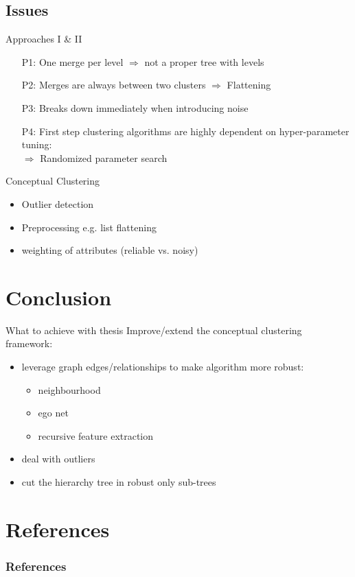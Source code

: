 \documentclass[rgb]{beamer}
\begin{document}
    \subsection{Issues}
        \begin{frame}{Approaches I \& II}
            \begin{itemize}
                \item[P1:] One merge per level $\Rightarrow$ not a proper tree with levels
                \item[P2:] Merges are always between two clusters
                $\Rightarrow$ Flattening
                \item[P3:] Breaks down immediately when introducing noise
                \item[P4:] First step clustering algorithms are highly dependent on hyper-parameter tuning: \\
                $\Rightarrow$ Randomized parameter search
            \end{itemize}
        \end{frame}

    \begin{frame}{Conceptual Clustering}
        \begin{itemize}
            \item Outlier detection
            \item Preprocessing e.g. list flattening
            \item weighting of attributes (reliable vs. noisy)
        \end{itemize}
    \end{frame}


\section{Conclusion}
\begin{frame}{What to achieve with thesis}
    Improve/extend the conceptual clustering framework:
        \begin{itemize}
            \item \alert{leverage graph edges/relationships to make algorithm more robust:}
                \begin{itemize}
                    \item neighbourhood
                    \item ego net
                    \item recursive feature extraction
                \end{itemize}
            \item deal with outliers
            \item cut the hierarchy tree in robust only sub-trees
        \end{itemize}
\end{frame}{}

\section{References}
    \begin{frame}
      \frametitle{References}
      \begin{tiny}
      \nocite{*}
      \printbibliography
      \end{tiny}
    \end{frame}
\end{document}
